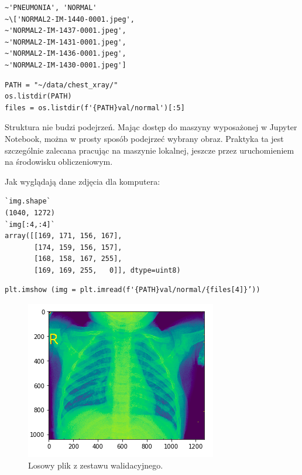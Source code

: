 \documentclass[12pt,a4paper,twoside,titlepage,openright]{book}
\begin{document}
\noindent
\begin{minipage}{\linewidth}
\begin{lstlisting}[caption=Podgląd danych, label=lst:test]
~'PNEUMONIA', 'NORMAL'
~\['NORMAL2-IM-1440-0001.jpeg',
~'NORMAL2-IM-1437-0001.jpeg',
~'NORMAL2-IM-1431-0001.jpeg',
~'NORMAL2-IM-1436-0001.jpeg',
~'NORMAL2-IM-1430-0001.jpeg']
\end{lstlisting}
\end{minipage}

\noindent
\begin{minipage}{\linewidth}
\begin{lstlisting}[caption=Wyświetlenie struktury danych, label=lst:test]
PATH = "~/data/chest_xray/"
os.listdir(PATH)
files = os.listdir(f'{PATH}val/normal')[:5]
\end{lstlisting}
\end{minipage}

Struktura nie budzi podejrzeń. Mając dostęp do maszyny wyposażonej w Jupyter Notebook, można w prosty sposób podejrzeć wybrany obraz. Praktyka ta jest szczególnie zalecana pracując na maszynie lokalnej, jeszcze przez uruchomieniem na środowisku obliczeniowym.

Jak wyglądają dane zdjęcia dla komputera:

\noindent
\begin{minipage}{\linewidth}
\begin{lstlisting}[caption=Struktura obrazu w formie macierzy, label=lst:test]
`img.shape`
(1040, 1272)
`img[:4,:4]`
array([[169, 171, 156, 167],
       [174, 159, 156, 157],
       [168, 158, 167, 255],
       [169, 169, 255,   0]], dtype=uint8)
\end{lstlisting}
\end{minipage}

\noindent
\begin{minipage}{\linewidth}
\begin{lstlisting}[caption=Wyświetlenie obrazu w środowisku graficznym, label=lst:test]
plt.imshow (img = plt.imread(f'{PATH}val/normal/{files[4]}’))
\end{lstlisting}
\end{minipage}

\begin{figure}[ht]
	\centering
			\includegraphics[resolution=100, scale=0.7]{ExampleLungImage.png}
		\caption{Losowy plik z zestawu walidacyjnego.}
\end{figure}
\end{document}
